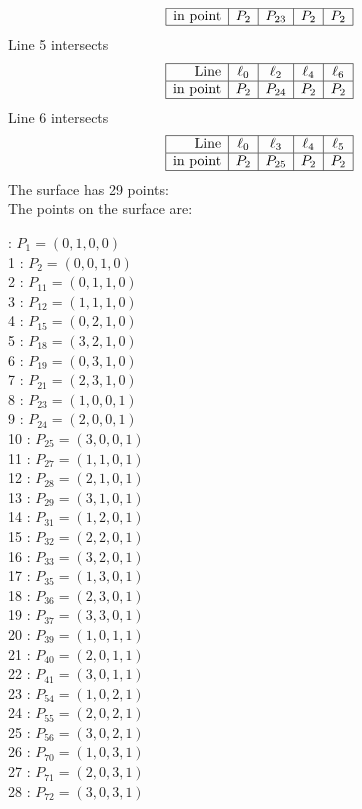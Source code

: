 \documentclass{article}
\begin{document}
{$$\begin{array}{|r*{4}{|c}|}
\hline
\mbox{in point}  & P_{2} & P_{23} & P_{2} & P_{2}\\
\hline
\end{array}
$$
Line 5 intersects 
$$
\begin{array}{|r*{4}{|c}|}
\hline
\mbox{Line}  & \ell_{0} & \ell_{2} & \ell_{4} & \ell_{6}\\
\hline
\mbox{in point}  & P_{2} & P_{24} & P_{2} & P_{2}\\
\hline
\end{array}
$$
Line 6 intersects 
$$
\begin{array}{|r*{4}{|c}|}
\hline
\mbox{Line}  & \ell_{0} & \ell_{3} & \ell_{4} & \ell_{5}\\
\hline
\mbox{in point}  & P_{2} & P_{25} & P_{2} & P_{2}\\
\hline
\end{array}
$$
The surface has 29 points:\\
The points on the surface are:\\
\begin{multicols}{3}
 : $P_{1}=( 0, 1, 0, 0 )$\\
1 : $P_{2}=( 0, 0, 1, 0 )$\\
2 : $P_{11}=( 0, 1, 1, 0 )$\\
3 : $P_{12}=( 1, 1, 1, 0 )$\\
4 : $P_{15}=( 0, 2, 1, 0 )$\\
5 : $P_{18}=( 3, 2, 1, 0 )$\\
6 : $P_{19}=( 0, 3, 1, 0 )$\\
7 : $P_{21}=( 2, 3, 1, 0 )$\\
8 : $P_{23}=( 1, 0, 0, 1 )$\\
9 : $P_{24}=( 2, 0, 0, 1 )$\\
10 : $P_{25}=( 3, 0, 0, 1 )$\\
11 : $P_{27}=( 1, 1, 0, 1 )$\\
12 : $P_{28}=( 2, 1, 0, 1 )$\\
13 : $P_{29}=( 3, 1, 0, 1 )$\\
14 : $P_{31}=( 1, 2, 0, 1 )$\\
15 : $P_{32}=( 2, 2, 0, 1 )$\\
16 : $P_{33}=( 3, 2, 0, 1 )$\\
17 : $P_{35}=( 1, 3, 0, 1 )$\\
18 : $P_{36}=( 2, 3, 0, 1 )$\\
19 : $P_{37}=( 3, 3, 0, 1 )$\\
20 : $P_{39}=( 1, 0, 1, 1 )$\\
21 : $P_{40}=( 2, 0, 1, 1 )$\\
22 : $P_{41}=( 3, 0, 1, 1 )$\\
23 : $P_{54}=( 1, 0, 2, 1 )$\\
24 : $P_{55}=( 2, 0, 2, 1 )$\\
25 : $P_{56}=( 3, 0, 2, 1 )$\\
26 : $P_{70}=( 1, 0, 3, 1 )$\\
27 : $P_{71}=( 2, 0, 3, 1 )$\\
28 : $P_{72}=( 3, 0, 3, 1 )$\\
\end{multicols}


}
\end{document}
